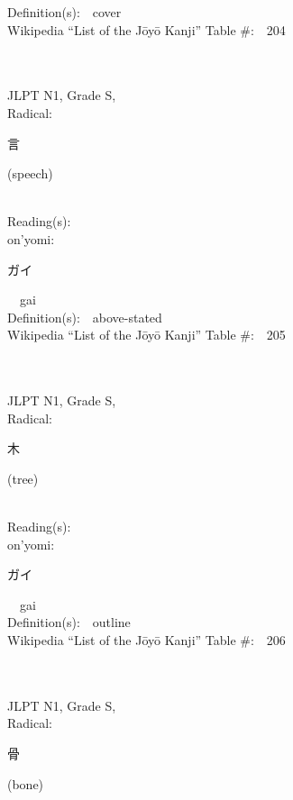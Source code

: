 \begin{multicols}{2}
Definition(s):\ \ cover \\
Wikipedia ``List of the J\=oy\=o Kanji'' Table \#:\ \ 204 \\
\ \ \\
{\fontsize{34pt}{40pt}  }\ \ \\
{JLPT N1, Grade S, \\Radical:\ \ {\begin{CJK}{UTF8}{min} 言 \end{CJK}} (speech) } \\
Reading(s):\ \ \\
{\hspace*{1em}}on'yomi:\ \ \\
{\hspace*{2em}}{\begin{CJK}{UTF8}{min} ガイ \end{CJK}}\ \ gai\ \ \\
Definition(s):\ \ above-stated \\
Wikipedia ``List of the J\=oy\=o Kanji'' Table \#:\ \ 205 \\
\ \ \\
{\fontsize{34pt}{40pt}  }\ \ \\
{JLPT N1, Grade S, \\Radical:\ \ {\begin{CJK}{UTF8}{min} 木 \end{CJK}} (tree) } \\
Reading(s):\ \ \\
{\hspace*{1em}}on'yomi:\ \ \\
{\hspace*{2em}}{\begin{CJK}{UTF8}{min} ガイ \end{CJK}}\ \ gai\ \ \\
Definition(s):\ \ outline \\
Wikipedia ``List of the J\=oy\=o Kanji'' Table \#:\ \ 206 \\
\ \ \\
{\fontsize{34pt}{40pt}  }\ \ \\
{JLPT N1, Grade S, \\Radical:\ \ {\begin{CJK}{UTF8}{min} 骨 \end{CJK}} (bone) } \\

\end{multicols}

